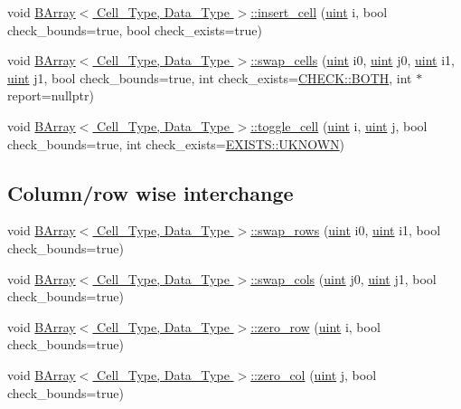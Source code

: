 \begin{DoxyCompactItemize}
\item 
void \hyperlink{group__barray-insert_ga8e930e9e59632684e9526f499bfff0e1}{B\+Array$<$ Cell\+\_\+\+Type, Data\+\_\+\+Type $>$\+::insert\+\_\+cell} (\hyperlink{typedefs_8hpp_a91ad9478d81a7aaf2593e8d9c3d06a14}{uint} i, bool check\+\_\+bounds=true, bool check\+\_\+exists=true)
\item 
void \hyperlink{group__barray-insert_gafb7976f67770b850922c1a7e1d6b07cc}{B\+Array$<$ Cell\+\_\+\+Type, Data\+\_\+\+Type $>$\+::swap\+\_\+cells} (\hyperlink{typedefs_8hpp_a91ad9478d81a7aaf2593e8d9c3d06a14}{uint} i0, \hyperlink{typedefs_8hpp_a91ad9478d81a7aaf2593e8d9c3d06a14}{uint} j0, \hyperlink{typedefs_8hpp_a91ad9478d81a7aaf2593e8d9c3d06a14}{uint} i1, \hyperlink{typedefs_8hpp_a91ad9478d81a7aaf2593e8d9c3d06a14}{uint} j1, bool check\+\_\+bounds=true, int check\+\_\+exists=\hyperlink{namespace_c_h_e_c_k_a3acda1c74bfabb5b6b67e19d0ad2d52a}{C\+H\+E\+C\+K\+::\+B\+O\+TH}, int $\ast$report=nullptr)
\item 
void \hyperlink{group__barray-insert_ga2ab2b200b329abc718cfb3574f566cf6}{B\+Array$<$ Cell\+\_\+\+Type, Data\+\_\+\+Type $>$\+::toggle\+\_\+cell} (\hyperlink{typedefs_8hpp_a91ad9478d81a7aaf2593e8d9c3d06a14}{uint} i, \hyperlink{typedefs_8hpp_a91ad9478d81a7aaf2593e8d9c3d06a14}{uint} j, bool check\+\_\+bounds=true, int check\+\_\+exists=\hyperlink{namespace_e_x_i_s_t_s_a81eb362d951445c658942a433afddb97}{E\+X\+I\+S\+T\+S\+::\+U\+K\+N\+O\+WN})
\end{DoxyCompactItemize}
\subsection*{Column/row wise interchange}
\begin{DoxyCompactItemize}
\item 
void \hyperlink{group__barray-insert_ga742773803481c18e2865b2b2a1e68949}{B\+Array$<$ Cell\+\_\+\+Type, Data\+\_\+\+Type $>$\+::swap\+\_\+rows} (\hyperlink{typedefs_8hpp_a91ad9478d81a7aaf2593e8d9c3d06a14}{uint} i0, \hyperlink{typedefs_8hpp_a91ad9478d81a7aaf2593e8d9c3d06a14}{uint} i1, bool check\+\_\+bounds=true)
\item 
void \hyperlink{group__barray-insert_gae94f7e61ca5985244968d9daf2859229}{B\+Array$<$ Cell\+\_\+\+Type, Data\+\_\+\+Type $>$\+::swap\+\_\+cols} (\hyperlink{typedefs_8hpp_a91ad9478d81a7aaf2593e8d9c3d06a14}{uint} j0, \hyperlink{typedefs_8hpp_a91ad9478d81a7aaf2593e8d9c3d06a14}{uint} j1, bool check\+\_\+bounds=true)
\item 
void \hyperlink{group__barray-insert_ga411085fcb7530669c72d9847340f1bac}{B\+Array$<$ Cell\+\_\+\+Type, Data\+\_\+\+Type $>$\+::zero\+\_\+row} (\hyperlink{typedefs_8hpp_a91ad9478d81a7aaf2593e8d9c3d06a14}{uint} i, bool check\+\_\+bounds=true)
\item 
void \hyperlink{group__barray-insert_ga0fa473027d00ec53ed08eaea03ac3ef7}{B\+Array$<$ Cell\+\_\+\+Type, Data\+\_\+\+Type $>$\+::zero\+\_\+col} (\hyperlink{typedefs_8hpp_a91ad9478d81a7aaf2593e8d9c3d06a14}{uint} j, bool check\+\_\+bounds=true)
\end{DoxyCompactItemize}


